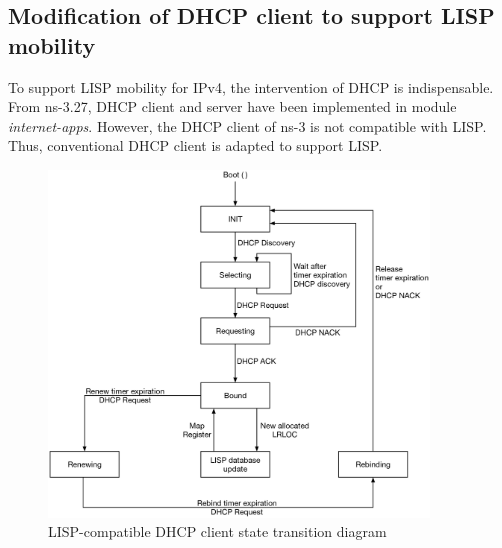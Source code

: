 \subsection{Modification of DHCP client to support LISP mobility}
\label{subsec:DHCP}
To support LISP mobility for IPv4, the intervention of DHCP is indispensable. From ns-3.27, DHCP client and server have been implemented in module \emph{internet-apps}. However, the DHCP client of ns-3 is not compatible with LISP. Thus, conventional DHCP client is adapted to support LISP.
\begin{figure}[!t]
	\centering
	\includegraphics[width=0.9\textwidth]{Pics/DHCP_transition_state.eps}
	\caption{LISP-compatible DHCP client state transition diagram}
	\label{fig:DHCP-state-transition}
\end{figure}
